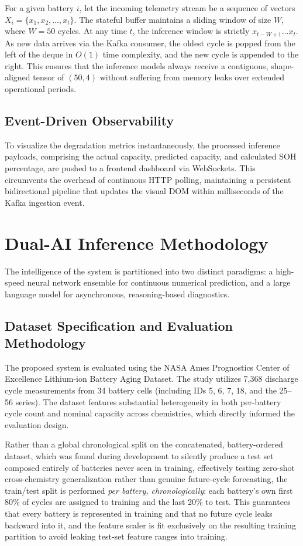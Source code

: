 For a given battery $i$, let the incoming telemetry stream be a sequence of vectors $X_i = \{x_1, x_2, \dots, x_t\}$. The stateful buffer maintains a sliding window of size $W$, where $W = 50$ cycles. At any time $t$, the inference window is strictly $x_{t-W+1} \dots x_t$. As new data arrives via the Kafka consumer, the oldest cycle is popped from the left of the deque in $O(1)$ time complexity, and the new cycle is appended to the right. This ensures that the inference models always receive a contiguous, shape-aligned tensor of $(50, 4)$ without suffering from memory leaks over extended operational periods.

\subsection{Event-Driven Observability}
To visualize the degradation metrics instantaneously, the processed inference payloads, comprising the actual capacity, predicted capacity, and calculated SOH percentage, are pushed to a frontend dashboard via WebSockets. This circumvents the overhead of continuous HTTP polling, maintaining a persistent bidirectional pipeline that updates the visual DOM within milliseconds of the Kafka ingestion event.

\section{\textbf{Dual-AI Inference Methodology}}

The intelligence of the system is partitioned into two distinct paradigms: a high-speed neural network ensemble for continuous numerical prediction, and a large language model for asynchronous, reasoning-based diagnostics.

\subsection{Dataset Specification and Evaluation Methodology}
The proposed system is evaluated using the NASA Ames Prognostics Center of Excellence Lithium-ion Battery Aging Dataset. The study utilizes 7,368 discharge cycle measurements from 34 battery cells (including IDs 5, 6, 7, 18, and the 25--56 series). The dataset features substantial heterogeneity in both per-battery cycle count and nominal capacity across chemistries, which directly informed the evaluation design.

Rather than a global chronological split on the concatenated, battery-ordered dataset, which was found during development to silently produce a test set composed entirely of batteries never seen in training, effectively testing zero-shot cross-chemistry generalization rather than genuine future-cycle forecasting, the train/test split is performed \emph{per battery, chronologically}: each battery's own first 80\% of cycles are assigned to training and the last 20\% to test. This guarantees that every battery is represented in training and that no future cycle leaks backward into it, and the feature scaler is fit exclusively on the resulting training partition to avoid leaking test-set feature ranges into training.

